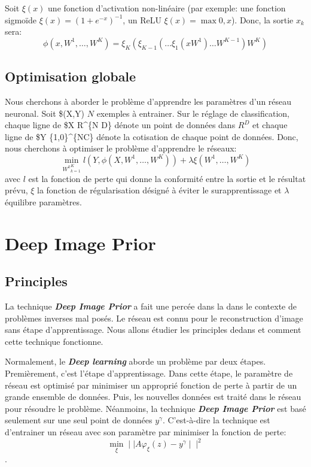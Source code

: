\documentclass[
  11pt,
  dvipsnames]{article}
\begin{document}
Soit \(\xi(x)\) une fonction d'activation non-linéaire (par exemple: une fonction sigmoïde \(\xi(x) = (1+e^{-x})^{-1}\), un ReLU \(\xi(x) = \max{0,x}\)). Donc, la sortie \(x_k\) sera:
\[\phi (x, W^1, \dots, W^K)=\xi_K(\xi_{K-1}(\dots \xi_1(xW^1)\dots W^{K-1})W^K)\]

\hypertarget{optimisation-globale}{%
\subsection{Optimisation globale}\label{optimisation-globale}}

Nous cherchons à aborder le problème d'apprendre les paramètres d'un réseau neuronal. Soit \$(X,Y) \(N\) exemples à entrainer. Sur le réglage de classification, chaque ligne de \$X \in R\^{}\{N \cdot D\} dénote un point de données dans \(R^D\) et chaque ligne de \$Y \in \{1,0\}\^{}\{N\cdot C\} dénote la cotisation de chaque point de données. Donc, nous cherchons à optimiser le problème d'apprendre le réseaux:
\[\min_{{W^k}_{k=1}^K} l(Y,\phi(X,W^1,\dots,W^K))+\lambda \xi(W^1,\dots,W^K)\] avec \(l\) est la fonction de perte qui donne la conformité entre la sortie et le résultat prévu, \(\xi\) la fonction de régularisation désigné à éviter le surapprentissage et \(\lambda\) équilibre paramètres.

\newpage

\hypertarget{deep-image-prior}{%
\section{Deep Image Prior}\label{deep-image-prior}}

\hypertarget{principles}{%
\subsection{Principles}\label{principles}}

La technique \textbf{\emph{Deep Image Prior}} a fait une percée dans la dans le contexte
de problèmes inverses mal posés. Le réseau est connu pour le reconstruction d'image sans étape d'apprentissage. Nous allons étudier les principles dedans et comment cette technique fonctionne.

Normalement, le \textbf{\emph{Deep learning}} aborde un problème par deux étapes. Premièrement, c'est l'étape d'apprentissage.
Dans cette étape, le paramètre de réseau est optimisé par minimiser un approprié fonction de perte à partir de
un grande ensemble de données. Puis, les nouvelles données est traité dans le réseau pour résoudre le problème.
Néanmoins, la technique \textbf{\emph{Deep Image Prior}} est basé seulement sur une seul point de données \(y^\gamma\). C'est-à-dire
la technique est d'entrainer un réseau avec son paramètre par minimiser la fonction de perte: \[\min_{\xi} \mid\mid A\varphi_\xi(z) - y^\gamma \mid\mid^2\].
\end{document}
